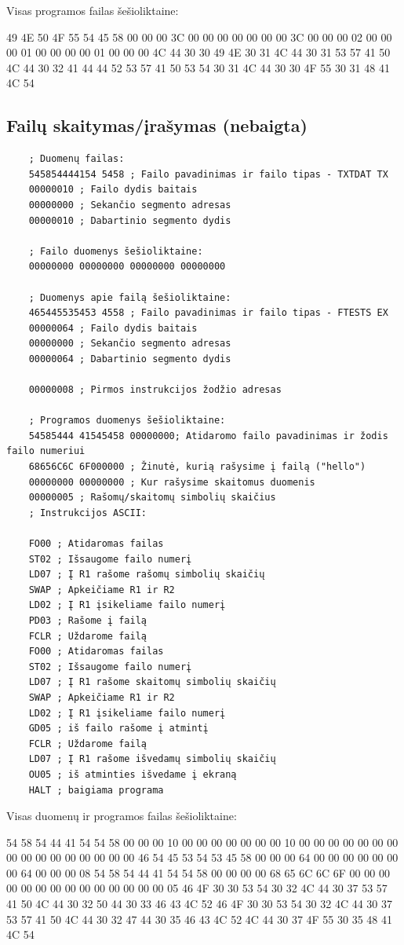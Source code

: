 Visas programos failas šešioliktaine:

49 4E 50 4F 55 54 45 58 00 00 00 3C 00 00 00 00 00 00 00 3C 00 00 00 02 00 00 00 01 00 00 00 00 01 00 00 00 4C 44 30 30 49 4E 30 31 4C 44 30 31 53 57 41 50 4C 44 30 32 41 44 44 52 53 57 41 50 53 54 30 31 4C 44 30 30 4F 55 30 31 48 41 4C 54

\subsection{Failų skaitymas/įrašymas (nebaigta)}
\begin{verbatim}
    ; Duomenų failas:
    545854444154 5458 ; Failo pavadinimas ir failo tipas - TXTDAT TX
    00000010 ; Failo dydis baitais
    00000000 ; Sekančio segmento adresas
    00000010 ; Dabartinio segmento dydis

    ; Failo duomenys šešioliktaine:
    00000000 00000000 00000000 00000000

    ; Duomenys apie failą šešioliktaine:
    465445535453 4558 ; Failo pavadinimas ir failo tipas - FTESTS EX
    00000064 ; Failo dydis baitais
    00000000 ; Sekančio segmento adresas
    00000064 ; Dabartinio segmento dydis
    
    00000008 ; Pirmos instrukcijos žodžio adresas

    ; Programos duomenys šešioliktaine:
    54585444 41545458 00000000; Atidaromo failo pavadinimas ir žodis failo numeriui
    68656C6C 6F000000 ; Žinutė, kurią rašysime į failą ("hello")
    00000000 00000000 ; Kur rašysime skaitomus duomenis
    00000005 ; Rašomų/skaitomų simbolių skaičius
    ; Instrukcijos ASCII:
    
    FO00 ; Atidaromas failas
    ST02 ; Išsaugome failo numerį
    LD07 ; Į R1 rašome rašomų simbolių skaičių
    SWAP ; Apkeičiame R1 ir R2
    LD02 ; Į R1 įsikeliame failo numerį
    PD03 ; Rašome į failą
    FCLR ; Uždarome failą
    FO00 ; Atidaromas failas
    ST02 ; Išsaugome failo numerį
    LD07 ; Į R1 rašome skaitomų simbolių skaičių
    SWAP ; Apkeičiame R1 ir R2
    LD02 ; Į R1 įsikeliame failo numerį
    GD05 ; iš failo rašome į atmintį
    FCLR ; Uždarome failą
    LD07 ; Į R1 rašome išvedamų simbolių skaičių
    OU05 ; iš atminties išvedame į ekraną
    HALT ; baigiama programa
\end{verbatim}

Visas duomenų ir programos failas šešioliktaine:

54 58 54 44 41 54 54 58 00 00 00 10 00 00 00 00 00 00 00 10 00 00 00 00 00 00 00 00 00 00 00 00 00 00 00 00 46 54 45 53 54 53 45 58 00 00 00 64 00 00 00 00 00 00 00 64 00 00 00 08 54 58 54 44 41 54 54 58 00 00 00 00 68 65 6C 6C 6F 00 00 00 00 00 00 00 00 00 00 00 00 00 00 05 46 4F 30 30 53 54 30 32 4C 44 30 37 53 57 41 50 4C 44 30 32 50 44 30 33 46 43 4C 52 46 4F 30 30 53 54 30 32 4C 44 30 37 53 57 41 50 4C 44 30 32 47 44 30 35 46 43 4C 52 4C 44 30 37 4F 55 30 35 48 41 4C 54